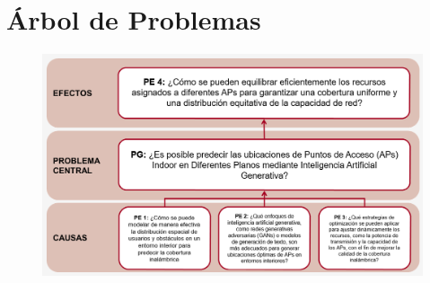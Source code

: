 
\appendix
\setcounter{section}{0}%
\renewcommand{\thesection}{\Alph{section}}%
	
	\section{Árbol de Problemas}
	\label{anexo1}
	\begin{figure}[h]
		\begin{center}
			\includegraphics[width=1.05\textwidth]{anexos/arbol_problemas.png}
		\end{center}
	\end{figure}
	\clearpage
	
